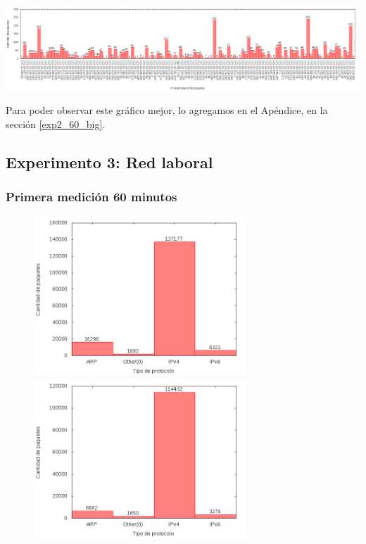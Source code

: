 \begin{center}
\includegraphics[width=16cm]{../mediciones/altop-wifi-60/altop60IpsDstArp.png}
\end{center}

Para poder observar este gráfico mejor, lo agregamos en el Apéndice, en la sección \ref{exp2_60_big}.

\subsection{Experimento 3: Red laboral}
\subsubsection{Primera medición 60 minutos}

\begin{figure}[!h]
\centering
\begin{minipage}{8cm}
  \centering
  \includegraphics[width=8cm]{../mediciones/job1/type.png}
\end{minipage}%
\begin{minipage}{8cm}
  \centering
  \includegraphics[width=8cm]{../mediciones/job2/type.png}
\end{minipage}
\end{figure}

